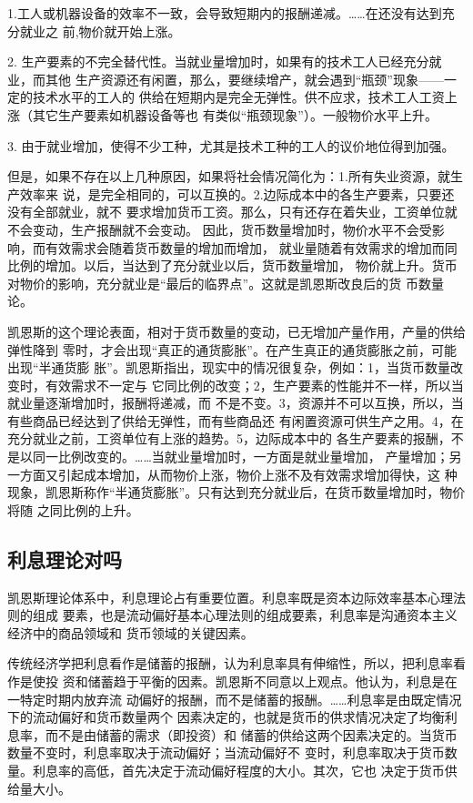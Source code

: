1.工人或机器设备的效率不一致，会导致短期内的报酬递减。……在还没有达到充分就业之
前,物价就开始上涨。

2. 生产要素的不完全替代性。当就业量增加时，如果有的技术工人已经充分就业，而其他
生产资源还有闲置，那么，要继续增产，就会遇到“瓶颈”现象——一定的技术水平的工人的
供给在短期内是完全无弹性。供不应求，技术工人工资上涨（其它生产要素如机器设备等也
有类似“瓶颈现象”）。一般物价水平上升。

3. 由于就业增加，使得不少工种，尤其是技术工种的工人的议价地位得到加强。

但是，如果不存在以上几种原因，如果将社会情况简化为：1.所有失业资源，就生产效率来
说，是完全相同的，可以互换的。2.边际成本中的各生产要素，只要还没有全部就业，就不
要求增加货币工资。那么，只有还存在着失业，工资单位就不会变动，生产报酬就不会变动。
因此，货币数量增加时，物价水平不会受影响，而有效需求会随着货币数量的增加而增加，
就业量随着有效需求的增加而同比例的增加。以后，当达到了充分就业以后，货币数量增加，
物价就上升。货币对物价的影响，充分就业是“最后的临界点”。这就是凯恩斯改良后的货
币数量论。

凯恩斯的这个理论表面，相对于货币数量的变动，已无增加产量作用，产量的供给弹性降到
零时，才会出现“真正的通货膨胀”。在产生真正的通货膨胀之前，可能出现“半通货膨
胀”。凯恩斯指出，现实中的情况很复杂，例如：1，当货币数量改变时，有效需求不一定与
它同比例的改变；2，生产要素的性能并不一样，所以当就业量逐渐增加时，报酬将递减，而
不是不变。3，资源并不可以互换，所以，当有些商品已经达到了供给无弹性，而有些商品还
有闲置资源可供生产之用。4，在充分就业之前，工资单位有上涨的趋势。5，边际成本中的
各生产要素的报酬，不是以同一比例改变的。……当就业量增加时，一方面是就业量增加，
产量增加；另一方面又引起成本增加，从而物价上涨，物价上涨不及有效需求增加得快，这
种现象，凯恩斯称作“半通货膨胀”。只有达到充分就业后，在货币数量增加时，物价将随
之同比例的上升。

\subsection{利息理论对吗}

凯恩斯理论体系中，利息理论占有重要位置。利息率既是资本边际效率基本心理法则的组成
要素，也是流动偏好基本心理法则的组成要素，利息率是沟通资本主义经济中的商品领域和
货币领域的关键因素。

传统经济学把利息看作是储蓄的报酬，认为利息率具有伸缩性，所以，把利息率看作是使投
资和储蓄趋于平衡的因素。凯恩斯不同意以上观点。他认为，利息是在一特定时期内放弃流
动偏好的报酬，而不是储蓄的报酬。……利息率是由既定情况下的流动偏好和货币数量两个
因素决定的，也就是货币的供求情况决定了均衡利息率，而不是由储蓄的需求（即投资）和
储蓄的供给这两个因素决定的。当货币数量不变时，利息率取决于流动偏好；当流动偏好不
变时，利息率取决于货币数量。利息率的高低，首先决定于流动偏好程度的大小。其次，它也
决定于货币供给量大小。


